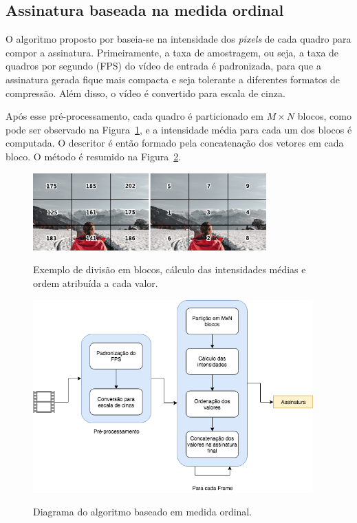 %
%
\subsection{Assinatura baseada na medida ordinal}
\label{sec:med_ordinal}

	O algoritmo proposto por  baseia-se na intensidade dos \textit{pixels} de cada quadro para compor a assinatura. Primeiramente, a taxa de amostragem, ou seja, a taxa de quadros por segundo (FPS) do vídeo de entrada é padronizada, para que a assinatura gerada fique mais compacta e seja tolerante a diferentes formatos de compressão. Além disso, o vídeo é convertido para escala de cinza.

	Após esse pré-processamento, cada quadro é particionado em $M \times N$ blocos, como pode ser observado na Figura~\ref{fig:medidaord}, e a intensidade média para cada um dos blocos é computada. O descritor é então formado pela concatenação dos vetores em cada bloco. O método é resumido na Figura~\ref{fig:dia_ordinal}.

	\begin{figure}[!htb]
        \centering
        \caption{Exemplo de divisão em blocos, cálculo das intensidades médias e ordem atribuída a cada valor.}
        \includegraphics[width=0.8\textwidth]{dados/figuras/mo_final.png}
        \label{fig:medidaord}
    \end{figure}

 \begin{figure}[!htb]
      \centering
      \caption{Diagrama do algoritmo baseado em medida ordinal.}
      \includegraphics[width=0.96\textwidth]{dados/figuras/diagramas/Diag-MO}
       	\label{fig:dia_ordinal}
    \end{figure}  


